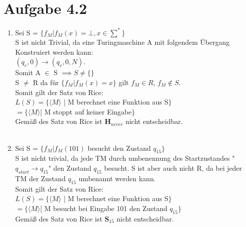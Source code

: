 \documentclass{article}
\begin{document}
	\section[a 4.2]{Aufgabe 4.2}
		\begin{enumerate} [label=\alph*.]
			\item Sei S = $\{f_M|f_M(x) = \bot, x \in \sum^*\}$\\
			S ist nicht Trivial, da eine Turingmaschine A mit folgendem Übergang Konstruiert werden kann: \\$(q_r,0) \rightarrow (q_r,0,N)$.\\ Somit A $\in$ S $\implies S \neq \{\}$\\
			S $\neq$ R da für $\{f_M|f_M(x) = x\}$ gilt $f_M \in R$, $f_M \notin S$.\\
			Somit gilt der Satz von Rice:\\
			$L(S) = \{\langle M\rangle$ | M berechnet eine Funktion aus S$\}$\\
			$= \{\langle M\rangle $| M stoppt auf keiner Eingabe$\}$\\
			Gemäß des Satz von Rice ist $\textbf{H}_{never}$ nicht entscheidbar.\\\\
			\item Sei S = $\{f_M|f_M(101)$ besucht den Zustand $q_{15}\}$\\
			S ist nicht trivial, da jede TM durch umbenennung des Startzustandes "$q_{start} \rightarrow q_{15}$" den Zustand $q_{15}$ besucht. S ist aber auch nicht R, da bei jeder TM der Zustand $q_{15}$ umbenannt werden kann.\\
			Somit gilt der Satz von Rice:\\
			$L(S) = \{\langle M\rangle$ | M berechnet eine Funktion aus S$\}$\\
			$= \{\langle M\rangle $| M besucht bei Eingabe 101 den Zustand $ q_{15}\}$\\
			Gemäß des Satz von Rice ist $\textbf{S}_{15}$ nicht entscheidbar.\\
		\end{enumerate}
\end{document}
